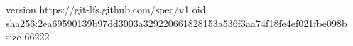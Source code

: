 version https://git-lfs.github.com/spec/v1
oid sha256:2ea69590139b97dd3003a329220661828153a536f3aa74f18fe4ef021fbe098b
size 66222
